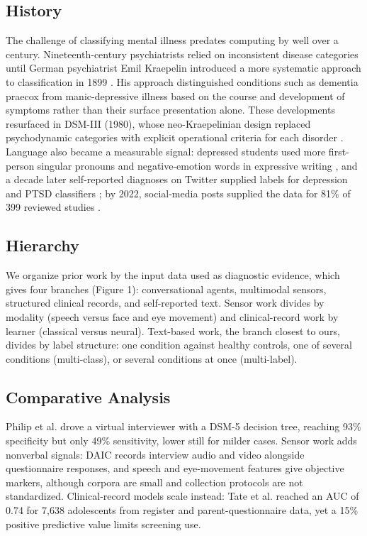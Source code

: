 \documentclass[sigconf]{acmart}
\begin{document}
\subsection{History}
The challenge of classifying mental illness predates computing by well over a century. Nineteenth-century psychiatrists relied on inconsistent disease categories until German psychiatrist Emil Kraepelin introduced a more systematic approach to classification in 1899 \cite{kawa2012brief, kraepelin1899psychiatrie}. His approach distinguished conditions such as dementia praecox from manic-depressive illness based on the course and development of symptoms rather than their surface presentation alone. These developments resurfaced in DSM-III (1980), whose neo-Kraepelinian design replaced psychodynamic categories with explicit operational criteria for each disorder \cite{kawa2012brief}. Language also became a measurable signal: depressed students used more first-person singular pronouns and negative-emotion words in expressive writing \cite{rude2004language}, and a decade later self-reported diagnoses on Twitter supplied labels for depression and PTSD classifiers \cite{coppersmith2015clpsych}; by 2022, social-media posts supplied the data for 81\% of 399 reviewed studies \cite{zhang2022natural}.

\subsection{Hierarchy}
We organize prior work by the input data used as diagnostic evidence, which gives four branches (Figure 1): conversational agents, multimodal sensors, structured clinical records, and self-reported text. Sensor work divides by modality (speech versus face and eye movement) and clinical-record work by learner (classical versus neural). Text-based work, the branch closest to ours, divides by label structure: one condition against healthy controls, one of several conditions (multi-class), or several conditions at once (multi-label).

\subsection{Comparative Analysis}
Philip et al. \cite{philip2017virtual} drove a virtual interviewer with a DSM-5 decision tree, reaching 93\% specificity but only 49\% sensitivity, lower still for milder cases. Sensor work adds nonverbal signals: DAIC \cite{gratch2014distress} records interview audio and video alongside questionnaire responses, and speech and eye-movement features \cite{alghowinem2013eye, cummins2015review} give objective markers, although corpora are small and collection protocols are not standardized. Clinical-record models scale instead: Tate et al. \cite{tate2020predicting} reached an AUC of 0.74 for 7,638 adolescents from register and parent-questionnaire data, yet a 15\% positive predictive value limits screening use. 
\end{document}
